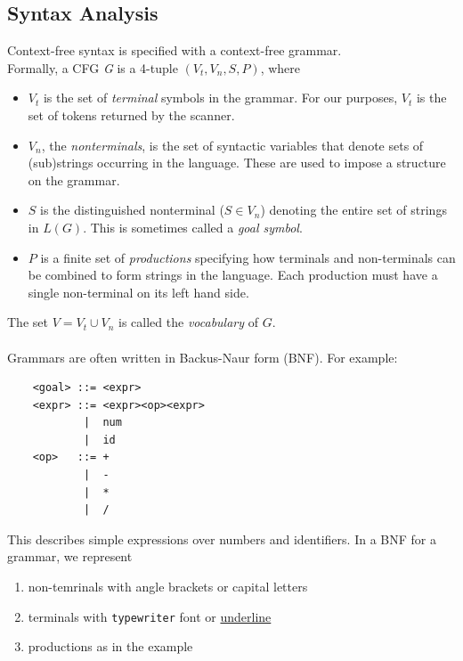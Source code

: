 \documentclass[10pt]{article}
\begin{document}
\subsection*{Syntax Analysis}
Context-free syntax is specified with a context-free grammar.\\
Formally, a CFG \textit{G} is a 4-tuple $(V_t, V_n, S, P)$, where
\begin{itemize}
    \item $V_t$ is the set of \textit{terminal} symbols in the grammar.  For our purposes, $V_t$ is the set of tokens returned by the scanner.
    \item $V_n$, the \textit{nonterminals}, is the set of syntactic variables that denote sets of (sub)strings occurring in the language.  These are used to impose a structure on the grammar.
    \item $S$ is the distinguished nonterminal ($S \in V_n$) denoting the entire set of strings in $L(G)$.  This is sometimes called a \textit{goal symbol}.
    \item $P$ is a finite set of \textit{productions} specifying how terminals and non-terminals can be combined to form strings in the language.  Each production must have a single non-terminal on its left hand side.
\end{itemize}
The set $V = V_t \cup V_n$ is called the \textit{vocabulary} of $G$.\\\\
Grammars are often written in Backus-Naur form (BNF).  For example:
\begin{verbatim}
    <goal> ::= <expr>
    <expr> ::= <expr><op><expr>
            |  num
            |  id
    <op>   ::= +
            |  -
            |  *
            |  /
\end{verbatim}
This describes simple expressions over numbers and identifiers.  In a BNF for a grammar, we represent
\begin{enumerate}
    \item non-temrinals with angle brackets or capital letters
    \item terminals with \texttt{typewriter} font or \underline{underline}
    \item productions as in the example
\end{enumerate}
\end{document}
